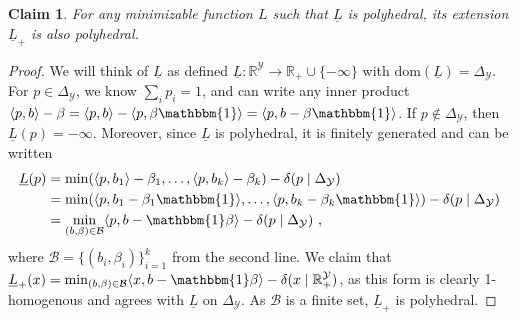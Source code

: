 \documentclass[twoside,11pt]{article}
\newcommand{\Comments}{1}
\newcommand{\mytodo}[2]{\ifnum\Comments=1%
  \todo[linecolor=#1!80!black,backgroundcolor=#1,bordercolor=#1!80!black]{#2}\fi}
\newcommand{\raft}[1]{\mytodo{green!20!white}{RF: #1}}
\newcommand{\reals}{\mathbb{R}}
\newcommand{\dom}{\mathrm{dom}}
\newcommand{\simplex}{\Delta_\Y}
\newcommand{\V}{\mathcal{V}}
\newcommand{\Y}{\mathcal{Y}}
\newcommand{\risk}[1]{\underline{#1}}
\newcommand{\inprod}[2]{\langle #1, #2 \rangle}%
\newcommand{\ones}{\mathbbm{1}}
\newtheorem{claim}{Claim}
\begin{document}
\begin{claim}\label{claim:extended-poly-risk-poly}
	For any minimizable function $L$ such that $\risk L$ is polyhedral, its extension $\risk L_+$ is also polyhedral.
\end{claim}
\begin{proof}
  We will think of $\risk L$ as defined $\risk L:\reals^\Y\to\reals_+\cup\{-\infty\}$  with $\dom(\risk L) = \simplex$.
For $p \in \simplex$, we know $\sum_i p_i = 1$, and can write any inner product $\inprod{p}{b} - \beta = \inprod{p}{b} - \inprod{p}{\beta \ones} = \inprod{p}{b - \beta \ones}$.
If $p \not \in \simplex$, then $\risk L(p) = -\infty$.
Moreover, since $\risk L$ is polyhedral, it is finitely generated \citep[Proposition 19.1.2]{rockafellar1997convex} and can be written
\newcommand{\B}{\mathcal{B}} 
\begin{align*}
\risk L(p) 
&= \min(\inprod{p}{b_1} - \beta_1, \ldots, \inprod{p}{b_k} - \beta_k) - \delta(p \mid \simplex)\\
&= \min(\inprod{p}{b_1 - \beta_1 \ones}, \ldots, \inprod{p}{b_k - \beta_k \ones}) - \delta(p \mid \simplex)\\
&= \min_{(b, \beta) \in \B} \inprod{p}{b - \ones \beta} - \delta(p \mid \simplex)~,
\end{align*}
where $\B = \{(b_i, \beta_i)\}_{i = 1}^k$ from the second line.
We claim that $\risk L_+(x) = \min_{(b, \beta) \in \B} \inprod{x}{b - \ones \beta} - \delta(x \mid \reals^\Y_+)$, as this form is clearly 1-homogenous and agrees with $\risk L$ on $\simplex$.
As $\B$ is a finite set, $\risk L_+$ is polyhedral.
\end{proof}

\end{document}
